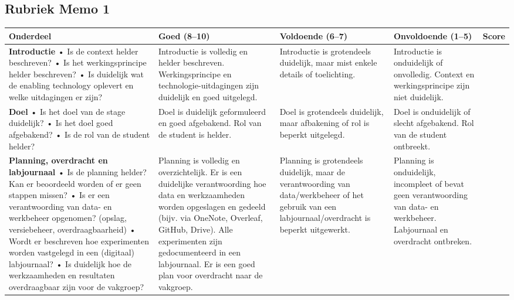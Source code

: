 \documentclass{article}
\begin{document}
\begin{landscape}

\section*{Rubriek Memo 1}
\renewcommand{\arraystretch}{1.4}

\begin{longtable}{p{7cm}|p{5cm}|p{5cm}|p{5cm}|p{1cm}}

\textbf{Onderdeel} & \textbf{Goed (8–10)} & \textbf{Voldoende (6–7)} & \textbf{Onvoldoende (1–5)} & \textbf{Score} \\
\hline
\hline

\textbf{Introductie} \newline
• Is de context helder beschreven? \newline
• Is het werkingsprincipe helder beschreven? \newline
• Is duidelijk wat de enabling technology oplevert en welke uitdagingen er zijn?
&
Introductie is volledig en helder beschreven. Werkingsprincipe en technologie-uitdagingen zijn duidelijk en goed uitgelegd.
&
Introductie is grotendeels duidelijk, maar mist enkele details of toelichting.
&
Introductie is onduidelijk of onvolledig. Context en werkingsprincipe zijn niet duidelijk.
& \\
\hline

\textbf{Doel} \newline
• Is het doel van de stage duidelijk? \newline
• Is het doel goed afgebakend? \newline
• Is de rol van de student helder?
&
Doel is duidelijk geformuleerd en goed afgebakend. Rol van de student is helder.
&
Doel is grotendeels duidelijk, maar afbakening of rol is beperkt uitgelegd.
&
Doel is onduidelijk of slecht afgebakend. Rol van de student ontbreekt.
& \\
\hline

\textbf{Planning, overdracht en labjournaal} \newline
• Is de planning helder? Kan er beoordeeld worden of er geen stappen missen? \newline
• Is er een verantwoording van data- en werkbeheer opgenomen? (opslag, versiebeheer, overdraagbaarheid) \newline
• Wordt er beschreven hoe experimenten worden vastgelegd in een (digitaal) labjournaal? \newline
• Is duidelijk hoe de werkzaamheden en resultaten overdraagbaar zijn voor de vakgroep? \newline
&
Planning is volledig en overzichtelijk. Er is een duidelijke verantwoording hoe data en werkzaamheden worden opgeslagen en gedeeld (bijv. via OneNote, Overleaf, GitHub, Drive). Alle experimenten zijn gedocumenteerd in een labjournaal. Er is een goed plan voor overdracht naar de vakgroep. 
&
Planning is grotendeels duidelijk, maar de verantwoording van data/werkbeheer of het gebruik van een labjournaal/overdracht is beperkt uitgewerkt.
&
Planning is onduidelijk, incompleet of bevat geen verantwoording van data- en werkbeheer. Labjournaal en overdracht ontbreken.
& \\
\hline


\end{longtable}
\end{landscape}
\end{document}
